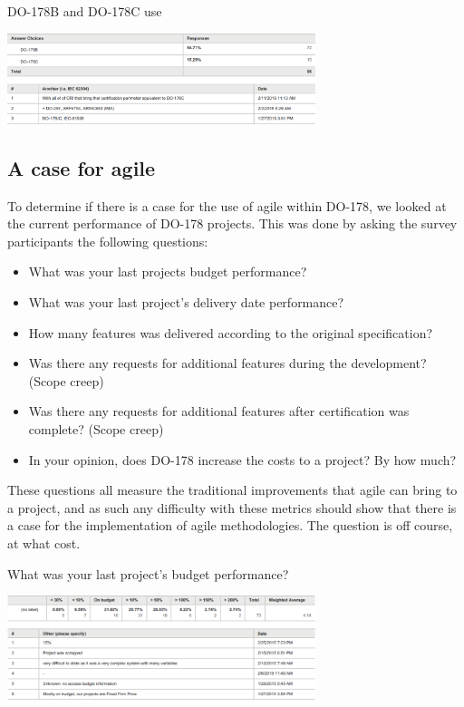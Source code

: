 \documentclass{sig-alternate-05-2015}
\begin{document}
\begin{table}[t!]
	\centering
	\caption{DO-178B and DO-178C use}
	\includegraphics[width=90mm]{BvsC.png}
\end{table}

\subsection{A case for agile}
To determine if there is a case for the use of agile within DO-178, we looked at the current performance of DO-178 projects. This was done by asking the survey participants the following questions:

\begin{itemize}
	\item What was your last projects budget performance?
	\item What was your last project's delivery date performance?
	\item How many features was delivered according to the original specification?
	\item Was there any requests for additional features during the development? (Scope creep)
	\item Was there any requests for additional features after certification was complete? (Scope creep)
	\item In your opinion, does DO-178 increase the costs to a project? By how much?
\end{itemize}

These questions all measure the traditional improvements that agile can bring to a project, and as such any difficulty with these metrics should show that there is a case for the implementation of agile methodologies. The question is off course, at what cost.

\begin{table}[t!]
	\centering
	\caption{What was your last project's budget performance?}
	\includegraphics[width=90mm]{What_was_your_last_projects_budget_performance.png}
\end{table}
\end{document}
